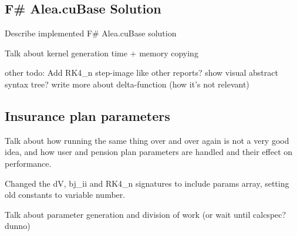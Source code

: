\subsection{F\# Alea.cuBase Solution}
Describe implemented F\# Alea.cuBase solution

Talk about kernel generation time + memory copying

other todo: 
	Add RK4\_n step-image like other reports? 
	show visual abstract syntax tree? 
	write more about delta-function (how it's not relevant)



\subsection{Insurance plan parameters}
Talk about how running the same thing over and over again is not a very good idea, and how user and pension plan parameters are handled and their effect on performance.

Changed the dV, bj\_ii and RK4\_n signatures to include params array, setting old constants to variable number.

Talk about parameter generation and division of work (or wait until calcspec? dunno)